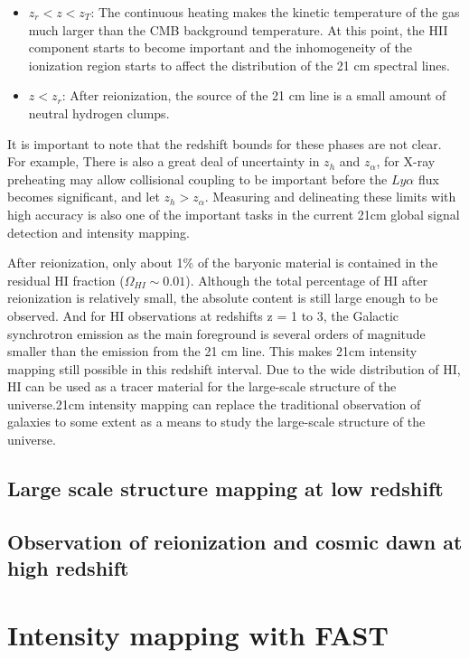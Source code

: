 \documentclass{article}
\begin{document}
\begin{itemize}
    \item $z_r<z<z_T$: The continuous heating makes the kinetic temperature of the gas much larger than the CMB background temperature. At this point, the HII component starts to become important and the inhomogeneity of the ionization region starts to affect the distribution of the 21 cm spectral lines.
    \item $z<z_r$: After reionization, the source of the 21 cm line is a small amount of neutral hydrogen clumps.
\end{itemize}
It is important to note that the redshift bounds for these phases are not clear. For example, There is also a great deal of uncertainty in $z_h$ and $z_\alpha$, for X-ray preheating may allow collisional coupling to be important before the $Ly\alpha$ flux becomes significant, and let $z_h>z_\alpha$. Measuring and delineating these limits with high accuracy is also one of the important tasks in the current 21cm global signal detection and intensity mapping.

After reionization, only about 1\% of the baryonic material is contained in the residual HI fraction ($\Omega_{HI}\sim 0.01$). Although the total percentage of HI after reionization is relatively small, the absolute content is still large enough to be observed. And for HI observations at redshifts z = 1 to 3, the Galactic synchrotron emission as the main foreground is several orders of magnitude smaller than the emission from the 21 cm line. This makes 21cm intensity mapping still possible in this redshift interval. Due to the wide distribution of HI, HI can be used as a tracer material for the large-scale structure of the universe.21cm intensity mapping can replace the traditional observation of galaxies to some extent as a means to study the large-scale structure of the universe.

\subsection{Large scale structure mapping at low redshift}

\subsection{Observation of reionization and cosmic dawn at high redshift}

\section{Intensity mapping with FAST}
\end{document}
